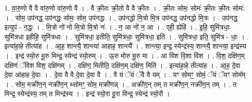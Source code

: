\documentclass[17pt]{extarticle}
\begin{document}
1. वा॒रु॒णो वै वै वा॑रु॒णो वा॑रु॒णो वै । . वै क्री॒तः क्री॒तो वै वै क्री॒तः । . क्री॒तः सोमः॒ सोमः॑ क्री॒तः क्री॒तः सोमः॑ । . सोम॒ उप॑नद्ध॒ उप॑नद्धः॒ सोमः॒ सोम॒ उप॑नद्धः । . उप॑नद्धो मि॒त्रो मि॒त्र उप॑नद्ध॒ उप॑नद्धो मि॒त्रः । . उप॑नद्ध॒ इत्युप॑ - न॒द्धः॒ । . मि॒त्रो नो॑ नो मि॒त्रो मि॒त्रो नः॑ । . न॒ आ नो॑ न॒ आ । . एही॒ ह्येहि॑ । . इ॒हि॒ सुमि॑त्रधाः॒ सुमि॑त्रधा इहीहि॒ सुमि॑त्रधाः । . सुमि॑त्रधा॒ इतीति॒ सुमि॑त्रधाः॒ सुमि॑त्रधा॒ इति॑ । . सुमि॑त्रधा॒ इति॒ सुमि॑त्र - धाः॒ । . इत्या॑हा॒हे तीत्या॑ह । . आ॒ह॒ शान्त्यै॒ शान्त्या॑ आहाह॒ शान्त्यै᳚ । . शान्त्या॒ इन्द्र॒ स्येन्द्र॑स्य॒ शान्त्यै॒ शान्त्या॒ इन्द्र॑स्य । . इन्द्र॑ स्यो॒रु मू॒रु मिन्द्र॒ स्येन्द्र॑ स्यो॒रुम् । . ऊ॒रु मोरु मू॒रु मा । . आ वि॑श वि॒शा वि॑श । . वि॒श॒ दक्षि॑ण॒म् दक्षि॑णं ॅविश विश॒ दक्षि॑णम् । . दक्षि॑ण॒ मितीति॒ दक्षि॑ण॒म् दक्षि॑ण॒ मिति॑ । . इत्या॑हा॒हे तीत्या॑ह । . आ॒ह॒ दे॒वा दे॒वा आ॑हाह दे॒वाः । . दे॒वा वै वै दे॒वा दे॒वा वै । . वै यं ॅयं ॅवै वै यम् । . यꣳ सोमꣳ॒॒ सोमं॒ ॅयं ॅयꣳ सोम᳚म् । . सोम॒ मक्री॑ण॒न् नक्री॑ण॒न् थ्सोमꣳ॒॒ सोम॒ मक्री॑णन्न् । . अक्री॑ण॒न् तम् त मक्री॑ण॒न् नक्री॑ण॒न् तम् । . त मिन्द्र॒ स्येन्द्र॑स्य॒ तम् त मिन्द्र॑स्य । . इन्द्र॑ स्यो॒रा वू॒रा विन्द्र॒ स्येन्द्र॑ स्यो॒रौ । \newline
\end{document}
